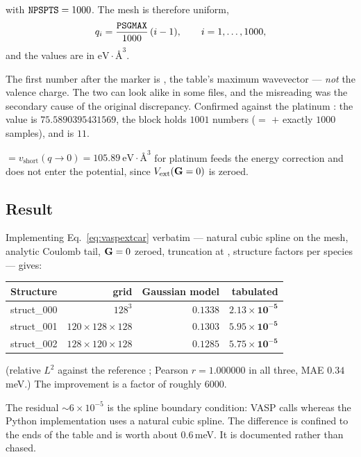 with $\texttt{NPSPTS}=1000$. The mesh is therefore uniform,
\begin{equation}
  q_i = \frac{\texttt{PSGMAX}}{1000}\,(i-1),
  \qquad i = 1,\dots,1000,
\end{equation}
and the values are in $\mathrm{eV}\cdot\text{\AA}^3$.

\begin{pnote}
The first number after the marker is , the table's maximum
wavevector --- \emph{not} the valence charge. The two can look alike in some
files, and the misreading was the secondary cause of the original discrepancy.
Confirmed against the platinum : the value is $75.5890395431569$, the
block holds $1001$ numbers ($=$  $+$ exactly $1000$ samples), and
 is $11$.
\end{pnote}

 $= v_{\mathrm{short}}(q\to0) = 105.89\ \mathrm{eV}\cdot\text{\AA}^3$
for platinum feeds the  energy correction and does not enter the
potential, since $V_{\mathrm{ext}}(\mathbf{G}=0)$ is zeroed.

\subsection{Result}

Implementing Eq.~\eqref{eq:vaspextcar} verbatim --- natural cubic spline on the
 mesh, analytic Coulomb tail, $\mathbf{G}=0$ zeroed, truncation at
, structure factors per species --- gives:

\begin{center}
\begin{tabular}{@{}lrrr@{}}
\toprule
Structure & grid & Gaussian model & \textbf{tabulated} \\
\midrule
struct\_000 & $128^3$ & $0.1338$ & $\mathbf{2.13\times10^{-5}}$ \\
struct\_001 & $120{\times}128{\times}128$ & $0.1303$ & $\mathbf{5.95\times10^{-5}}$ \\
struct\_002 & $128{\times}120{\times}128$ & $0.1285$ & $\mathbf{5.75\times10^{-5}}$ \\
\bottomrule
\end{tabular}
\end{center}

(relative $L^2$ against the reference ; Pearson $r = 1.000000$ in
all three, MAE $0.34$\,meV.) The improvement is a factor of roughly $6000$.

\begin{pwarn}
The residual $\sim6\times10^{-5}$ is the spline boundary condition: VASP calls
 whereas the Python implementation
uses a natural cubic spline. The difference is confined to the ends of the
table and is worth about $0.6$\,meV. It is documented rather than chased.
\end{pwarn}

